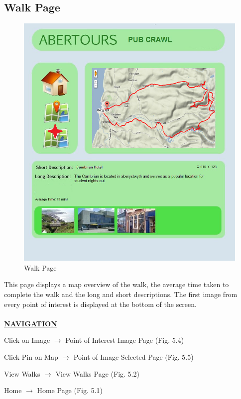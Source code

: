 \documentclass[12pt]{article}
\begin{document}
{\subsection{Walk Page}
\begin{figure}[htp]
\centering
\includegraphics[scale=0.50]{Project_Plan/Web/poi_selected_page_01_copy.jpg}

\caption{Walk Page }
\label{Walk Page}
\end{figure}
\par{This page displays a map overview of the walk, the average time taken to complete the walk and the long and short descriptions. The first image from every point of interest is displayed at the bottom of the screen. \\ \\}
\textbf{\uline{NAVIGATION}}
\par{Click on Image $\rightarrow$ Point of Interest Image Page (Fig. 5.4)}
\par{Click Pin on Map $\rightarrow$ Point of Image Selected Page (Fig. 5.5)}
\par{View Walks $\rightarrow$ View Walks Page (Fig. 5.2)}
\par{Home $\rightarrow$ Home Page (Fig. 5.1)}
\clearpage
}
\end{document}

